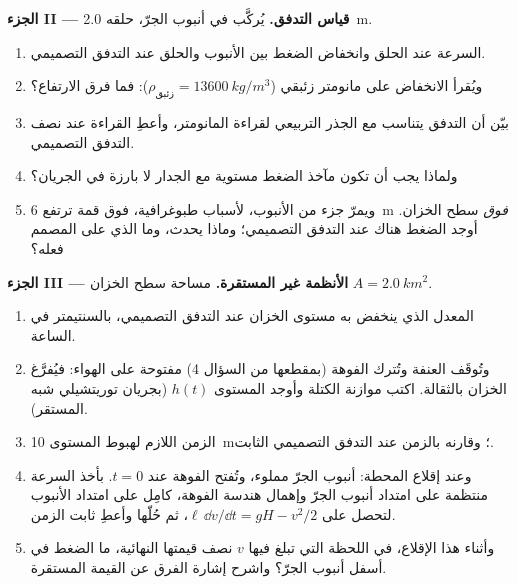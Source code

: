 \begin{problem}
\medskip
\noindent\textbf{الجزء II --- قياس التدفق.}
يُركَّب  في أنبوب الجرّ، حلقه \qty{2.0}{m}.
\begin{enumerate}[resume]
  \item السرعة عند الحلق وانخفاض الضغط بين الأنبوب والحلق عند
        التدفق التصميمي.
  \item ويُقرأ الانخفاض على مانومتر زئبقي ($\rho_{\text{زئبق}} =
        \qty{13600}{kg/m^3}$): فما فرق الارتفاع؟
  \item بيّن أن التدفق يتناسب مع الجذر التربيعي لقراءة
        المانومتر، وأعطِ القراءة عند نصف التدفق التصميمي.
  \item ولماذا يجب أن تكون مآخذ الضغط مستوية مع الجدار لا
        بارزة في الجريان؟
  \item ويمرّ جزء من الأنبوب، لأسباب طبوغرافية، فوق قمة ترتفع
        \qty{6}{m} \emph{فوق} سطح الخزان. أوجد الضغط هناك عند
        التدفق التصميمي؛ وماذا يحدث، وما الذي على المصمم فعله؟
\end{enumerate}

\medskip
\noindent\textbf{الجزء III --- الأنظمة غير المستقرة.}
مساحة سطح الخزان $A = \qty{2.0}{km^2}$.
\begin{enumerate}[resume]
  \item المعدل الذي ينخفض به مستوى الخزان عند التدفق
        التصميمي، بالسنتيمتر في الساعة.
  \item وتُوقَف العنفة وتُترك الفوهة (بمقطعها من السؤال 4)
        مفتوحة على الهواء: فيُفرَّغ الخزان بالثقالة. اكتب موازنة
        الكتلة وأوجد المستوى $h(t)$ (بجريان توريتشيلي شبه
        المستقر).
  \item الزمن اللازم لهبوط المستوى \qty{10}{m}؛ وقارنه بالزمن
        عند التدفق التصميمي الثابت.
  \item وعند إقلاع المحطة: أنبوب الجرّ مملوء، وتُفتح الفوهة
        عند $t = 0$. بأخذ السرعة منتظمة على امتداد أنبوب الجرّ
        وإهمال هندسة الفوهة، كامِل  على امتداد
        الأنبوب لتحصل على $\ell\,\dd v/\dd t = gH - v^2/2$، ثم حُلّها وأعطِ
        ثابت الزمن.
  \item وأثناء هذا الإقلاع، في اللحظة التي تبلغ فيها $v$ نصف
        قيمتها النهائية، ما الضغط في أسفل أنبوب الجرّ؟
        واشرح إشارة الفرق عن القيمة المستقرة.
\end{enumerate}


\end{problem}
